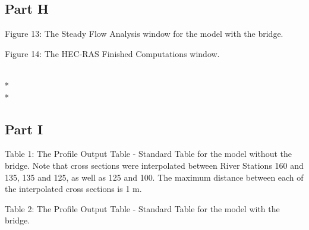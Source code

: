 \documentclass[]{article}
\begin{document}
\subsection{Part H}
 \begin{minipage}[t]{\linewidth}
	\raggedright
	
	\medskip
	\begin{center} 
		Figure 13: The Steady Flow Analysis window for the model with the bridge.
	\end{center}
\end{minipage} 
\newpage
 \begin{minipage}[t]{\linewidth}
	\raggedright
	
	\medskip
	\begin{center} 
		Figure 14: The HEC-RAS Finished Computations window.
	\end{center}
\end{minipage}  \\* \\*
\subsection{Part I}
 \begin{minipage}[t]{\linewidth}
	\raggedright
	
	\medskip
	\begin{center} 
		Table 1: The Profile Output Table - Standard Table for the model without the bridge. Note that cross sections were interpolated between River Stations 160 and 135, 135 and 125, as well as 125 and 100. The maximum distance between each of the interpolated cross sections is 1 m.
	\end{center}
\end{minipage}
 \begin{minipage}[t]{\linewidth}
	\raggedright
	
	\medskip
	\begin{center} 
		Table 2: The Profile Output Table - Standard Table for the model with the bridge.
	\end{center}
\end{minipage} 
\newpage
\end{document}

